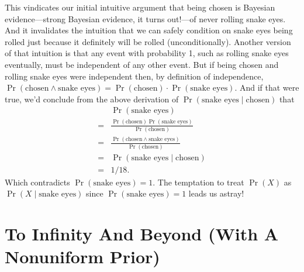 \documentclass[article,twocolumn]{memoir}
\begin{document}
This vindicates our initial intuitive argument that being chosen is Bayesian evidence---strong Bayesian evidence, it turns out!---of never rolling snake eyes.
And it invalidates the intuition that we can safely condition on snake eyes being rolled just because it definitely will be rolled (unconditionally).
Another version of that intuition is that any event with probability 1, such as rolling snake eyes eventually, must be independent of any other event.
But if being chosen and rolling snake eyes were independent then, by definition of independence,
$\Pr(\text{chosen} \land \text{snake eyes}) = \Pr(\text{chosen})\cdot\Pr(\text{snake eyes})$.
And if that were true, we'd conclude from the above derivation of $\Pr(\text{snake eyes}\mid\text{chosen})$ that
\begin{align*}
   & \Pr(\text{snake eyes})\\
 = & \frac{\Pr(\text{chosen})\Pr(\text{snake eyes})}{\Pr(\text{chosen})}\\
 = & \frac{\Pr(\text{chosen} \land \text{snake eyes})}{\Pr(\text{chosen})}\\
 = & \Pr(\text{snake eyes}\mid\text{chosen})\\
 = & 1/18.
\end{align*}
Which contradicts $\Pr(\text{snake eyes}) = 1$.
The temptation to treat $\Pr(X)$ as $\Pr(X \mid \text{snake eyes})$ since $\Pr(\text{snake eyes}) = 1$ leads us astray!



\chapter{To Infinity And Beyond (With A Nonuniform Prior)}
\end{document}
